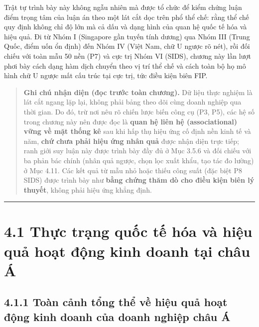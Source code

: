 \documentclass[
  a4paper,
  13pt]{extreport}
\begin{document}
Trật tự trình bày này không ngẫu nhiên mà được tổ chức để kiểm chứng
luận điểm trọng tâm của luận án theo một lát cắt dọc trên phổ thể chế:
rằng thể chế quy định không chỉ độ lớn mà cả dấu và dạng hình của quan
hệ quốc tế hóa và hiệu quả. Đi từ Nhóm I (Singapore gần tuyến tính
dương) qua Nhóm III (Trung Quốc, điểm uốn ổn định) đến Nhóm IV (Việt
Nam, chữ U ngược rõ nét), rồi đối chiếu với toàn mẫu 50 nền (P7) và cực
trị Nhóm VI (SIDS), chương này lần lượt phơi bày cách dạng hàm dịch
chuyển theo vị trí thể chế và cách toàn bộ họ mô hình chữ U ngược mất
cấu trúc tại cực trị, tức điều kiện biên FIP.

\begin{quote}
\textbf{Ghi chú nhận diện (đọc trước toàn chương).} Dữ liệu thực nghiệm
là lát cắt ngang lặp lại, không phải bảng theo dõi cùng doanh nghiệp qua
thời gian. Do đó, trừ nơi nêu rõ chiến lược biến công cụ (P3, P5), các
hệ số trong chương này nên được đọc là \textbf{quan hệ liên hệ
(associational) vững về mặt thống kê} sau khi hấp thụ hiệu ứng cố định
nền kinh tế và năm, \textbf{chứ chưa phải hiệu ứng nhân quả} được nhận
diện trực tiếp; ranh giới suy luận này được trình bày đầy đủ ở Mục 3.5.6
và đối chiếu với ba phản bác chính (nhân quả ngược, chọn lọc xuất khẩu,
tạo tác đo lường) ở Mục 4.11. Các kết quả từ mẫu nhỏ hoặc thiếu công
suất (đặc biệt P8 SIDS) được trình bày như \textbf{bằng chứng thăm dò
cho điều kiện biên lý thuyết}, không phải hiệu ứng khẳng định.
\end{quote}

\begin{center}\rule{0.5\linewidth}{0.5pt}\end{center}

\hypertarget{thux1ef1c-trux1ea1ng-quux1ed1c-tux1ebf-huxf3a-vuxe0-hiux1ec7u-quux1ea3-houx1ea1t-ux111ux1ed9ng-kinh-doanh-tux1ea1i-chuxe2u-uxe1}{%
\section{4.1 Thực trạng quốc tế hóa và hiệu quả hoạt động kinh doanh tại
châu
Á}\label{thux1ef1c-trux1ea1ng-quux1ed1c-tux1ebf-huxf3a-vuxe0-hiux1ec7u-quux1ea3-houx1ea1t-ux111ux1ed9ng-kinh-doanh-tux1ea1i-chuxe2u-uxe1}}

\hypertarget{touxe0n-cux1ea3nh-tux1ed5ng-thux1ec3-vux1ec1-hiux1ec7u-quux1ea3-houx1ea1t-ux111ux1ed9ng-kinh-doanh-cux1ee7a-doanh-nghiux1ec7p-chuxe2u-uxe1}{%
\subsection{4.1.1 Toàn cảnh tổng thể về hiệu quả hoạt động kinh doanh
của doanh nghiệp châu
Á}\label{touxe0n-cux1ea3nh-tux1ed5ng-thux1ec3-vux1ec1-hiux1ec7u-quux1ea3-houx1ea1t-ux111ux1ed9ng-kinh-doanh-cux1ee7a-doanh-nghiux1ec7p-chuxe2u-uxe1}}
\end{document}

